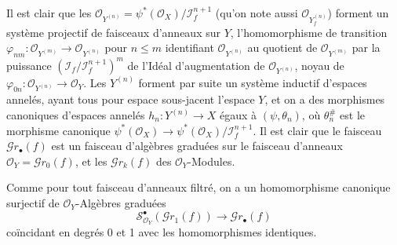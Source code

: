 Il est clair que les
$\mathcal{O}_{Y^{(n)}}=\psi^*(\mathcal{O}_X)/\mathscr{I}_f^{n+1}$
(qu'on note aussi $\mathcal{O}_{Y_f^{(n)}}$) forment un
système projectif de faisceaux d'anneaux sur $Y$, l'homomorphisme de transition
$\varphi_{nm}:\mathcal{O}_{Y^{(m)}}\to\mathcal{O}_{Y^{(n)}}$ pour $n\leq m$
identifiant $\mathcal{O}_{Y^{(n)}}$ au quotient de $\mathcal{O}_{Y^{(m)}}$ par la
puissance $(\mathscr{I}_f/\mathscr{I}_f^{n+1})^m$ de l'Idéal d'augmentation de
$\mathcal{O}_{Y^{(n)}}$, noyau de
$\varphi_{0n}:\mathcal{O}_{Y^{(n)}}\to\mathcal{O}_Y$. Les $Y^{(n)}$ forment par
suite un système inductif d'espaces annelés, ayant tous pour espace sous-jacent
l'espace $Y$, et on a des morphismes canoniques d'espaces annelés
$h_n:Y^{(n)}\to X$ égaux à $(\psi,\theta_n)$, où $\theta_n^\#$ est le morphisme
canonique
$\psi^*(\mathcal{O}_X)\to\psi^*(\mathcal{O}_X)/\mathscr{I}_f^{n+1}$.
Il est clair que le faisceau $\mathscr{G}r_\bullet(f)$ est un faisceau d'algèbres
graduées sur le faisceau d'anneaux
$\mathcal{O}_Y=\mathscr{G}r_0(f)$, et les $\mathscr{G}r_k(f)$ des
$\mathcal{O}_Y$-Modules.

Comme pour tout faisceau d'anneaux filtré, on a un homomorphisme canonique
surjectif de $\mathcal{O}_Y$-Algèbres graduées
\[
  \mathscr{S}_{\mathcal{O}_Y}^{\bullet}(\mathscr{G}r_1(f))
  \longrightarrow\mathscr{G}r_\bullet(f)
  \tag{16.1.2.2}
  \label{IV.16.1.2.2}
\]
coïncidant en degrés 0 et 1 avec les homomorphismes identiques.

